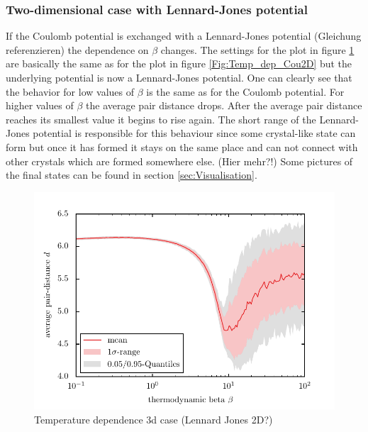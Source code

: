 \documentclass[11pt, a4paper]{article}
\numberwithin{equation}{section}
\newcommand{\remark}[1]{{\color{red}(#1)}}
\begin{document}
\subsubsection{Two-dimensional case with Lennard-Jones potential}
If the Coulomb potential is exchanged with a Lennard-Jones potential \remark{Gleichung referenzieren} the dependence on $\beta$ changes.
The settings for the plot in figure \ref{Fig:Temp_dep_LJ2D} are basically the same as for the plot in figure \ref{Fig:Temp_dep_Cou2D} but the underlying potential is now a Lennard-Jones potential.
One can clearly see that the behavior for low values of $\beta$ is the same as for the Coulomb potential.
For higher values of $\beta$ the average pair distance drops.
After the average pair distance reaches its smallest value it begins to rise again.
The short range of the Lennard-Jones potential is responsible for this behaviour since some crystal-like state can form but once it has formed it stays on the same place and can not connect with other crystals which are formed somewhere else. \remark{Hier mehr?!}
Some pictures of the final states can be found in section \ref{sec:Visualisation}.

\begin{figure}
	\centering
	\includegraphics{./figures/temp_dep_lennard_jones2d.pdf}
	\caption{Temperature dependence 3d case \remark{Lennard Jones 2D?}}
	\label{Fig:Temp_dep_LJ2D}
\end{figure}
\end{document}
